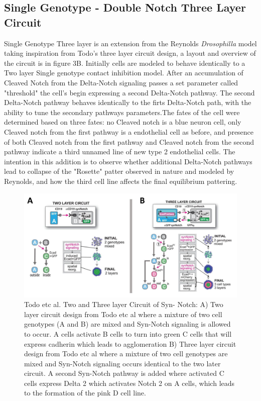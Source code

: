 \documentclass[12pt]{ifacconf}
\begin{document}
\subsection{Single Genotype - Double Notch Three Layer Circuit}

Single Genotype Three layer is an extension from the Reynolds \emph{Drosophilla} model taking inspiration from Todo's three layer circuit design, a layout and overview of the circuit is in figure 3B. Initially cells are modeled to behave identically to a Two layer Single genotype contact inhibition model. After an accumulation of Cleaved Notch from the Delta-Notch signaling passes a set parameter called "threshold" the cell's begin expressing a second Delta-Notch pathway. The second Delta-Notch pathway behaves identically to the firts Delta-Notch path, with the ability to tune the secondary pathways parameters.The fates of the cell were determined based on three fates: no Cleaved notch is a blue neuron cell, only Cleaved notch from the first pathway is a endothelial cell as before, and presence of both Cleaved notch from the first pathway and Cleaved notch from the second pathway indicate a third unnamed line of new type 2 endothelial cells. The intention in this addition is to observe whether additional Delta-Notch pathways lead to collapse of the "Rosette" patter observed in nature and modeled by Reynolds, and how the third cell line affects the final equilibrium pattering.



\begin{figure}
\begin{center}
\includegraphics[width=\textwidth]{Todo_etc_al_layer_circuit_design}    %
\caption{Todo etc al. Two and Three layer Circuit of Syn- Notch: A) Two layer circuit design from Todo etc al where a mixture of two cell genotypes (A and B) are mixed and Syn-Notch signaling is allowed to occur. A cells activate B cells to turn into green C cells that will express cadherin which leads to agglomeration B) Three layer circuit design from Todo etc al where a mixture of two cell genotypes are mixed and Syn-Notch signaling occurs identical to the two later circuit. A second Syn-Notch pathway is added where activated C cells express Delta 2 which activates Notch 2 on A cells, which leads to the formation of the pink D cell line.  } 
\label{fig:bifurcation}
\end{center}
\end{figure}
\end{document}
